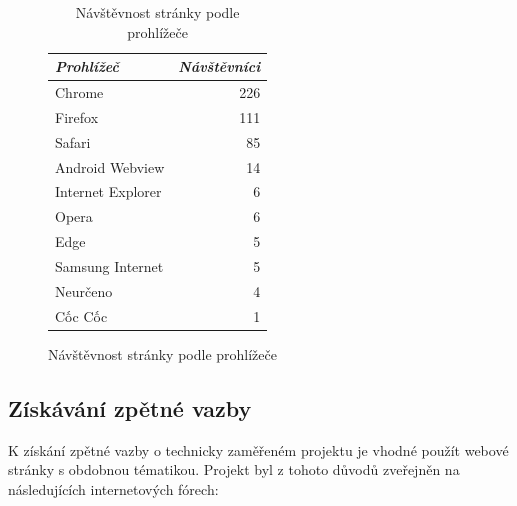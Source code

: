 \documentclass[a4paper, 12pt, twoside]{article}
\newcommand{\ra}[1]{\renewcommand{\arraystretch}{#1}} %
\begin{document}
\begin{figure}[H]
\begin{minipage}[b]{0.475\textwidth}
\begin{table}[H]
        \caption{Návštěvnost stránky podle prohlížeče}
        \label{tab:Návštěvnost stránky podle prohlížeče}
        \footnotesize
        \centering
        \ra{1.3}
        \begin{tabular}{lr}
          \toprule
          \emph{Prohlížeč} & \emph{Návštěvníci} \\
          \midrule
          Chrome            & \num{226} \\
          Firefox	          & \num{111} \\
          Safari            & \num{85} \\
          Android Webview   & \num{14} \\
          Internet Explorer & \num{6} \\
          Opera             & \num{6} \\
          Edge              & \num{5} \\
          Samsung Internet  & \num{5} \\
          Neurčeno          & \num{4} \\
          Cốc Cốc           & \num{1} \\
          \bottomrule
        \end{tabular}
      \end{table}
    \end{minipage}
  \end{figure}


  \subsection{Získávání zpětné vazby}
  K získání zpětné vazby o technicky zaměřeném projektu je vhodné použít webové stránky s obdobnou tématikou. Projekt byl z tohoto důvodů zveřejněn na následujících internetových fórech:
\end{document}

